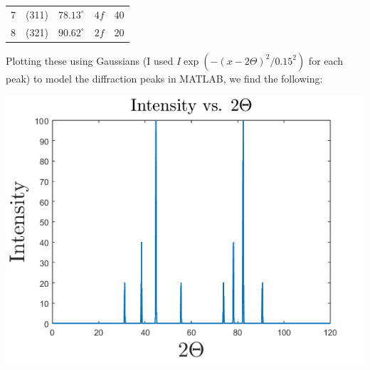 \documentclass{article}
\begin{document}
\begin{enumerate}
\begin{center}
\begin{tabular}{c|c|c|c|c}
             7 & (311) & $78.13^{\circ}$ & $4f$ & 40 \\
             8 & (321) & $90.62^{\circ}$ & $2f$ & 20 \\
        \end{tabular}
    \end{center}
    Plotting these using Gaussians (I used $I\exp{(-(x-2\Theta)^2/0.15^2)}$ for each peak) to model the diffraction peaks in MATLAB, we find the following:
    \begin{center}
        \includegraphics[scale = 0.6]{Intensity.png}
    \end{center}
    

\end{enumerate}
\end{document}
